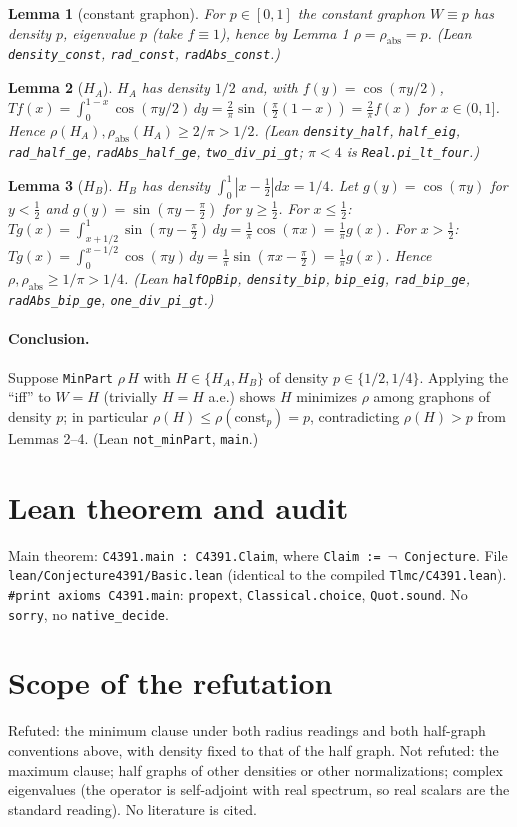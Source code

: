 \documentclass[11pt]{article}
\newtheorem{lemma}{Lemma}
\begin{document}
\begin{lemma}[constant graphon] For $p\in[0,1]$ the constant graphon $W\equiv p$ has density $p$, eigenvalue $p$ (take $f\equiv1$), hence by Lemma 1 $\rho=\rho_{\mathrm{abs}}=p$. (Lean \texttt{density\_const}, \texttt{rad\_const}, \texttt{radAbs\_const}.)\end{lemma}

\begin{lemma}[$H_A$] $H_A$ has density $1/2$ and, with $f(y)=\cos(\pi y/2)$, $T f(x)=\int_0^{1-x}\cos(\pi y/2)\,dy=\frac2\pi\sin(\frac\pi2(1-x))=\frac2\pi f(x)$ for $x\in(0,1]$. Hence $\rho(H_A),\rho_{\mathrm{abs}}(H_A)\ge 2/\pi>1/2$. (Lean \texttt{density\_half}, \texttt{half\_eig}, \texttt{rad\_half\_ge}, \texttt{radAbs\_half\_ge}, \texttt{two\_div\_pi\_gt}; $\pi<4$ is \texttt{Real.pi\_lt\_four}.)\end{lemma}

\begin{lemma}[$H_B$] $H_B$ has density $\int_0^1|x-\frac12|dx=1/4$. Let $g(y)=\cos(\pi y)$ for $y<\frac12$ and $g(y)=\sin(\pi y-\frac\pi2)$ for $y\ge\frac12$. For $x\le\frac12$: $T g(x)=\int_{x+1/2}^1\sin(\pi y-\frac\pi2)\,dy=\frac1\pi\cos(\pi x)=\frac1\pi g(x)$. For $x>\frac12$: $Tg(x)=\int_0^{x-1/2}\cos(\pi y)\,dy=\frac1\pi\sin(\pi x-\frac\pi2)=\frac1\pi g(x)$. Hence $\rho,\rho_{\mathrm{abs}}\ge1/\pi>1/4$. (Lean \texttt{halfOpBip}, \texttt{density\_bip}, \texttt{bip\_eig}, \texttt{rad\_bip\_ge}, \texttt{radAbs\_bip\_ge}, \texttt{one\_div\_pi\_gt}.)\end{lemma}

\paragraph{Conclusion.} Suppose \texttt{MinPart} $\rho\,H$ with $H\in\{H_A,H_B\}$ of density $p\in\{1/2,1/4\}$. Applying the ``iff'' to $W=H$ (trivially $H=H$ a.e.) shows $H$ minimizes $\rho$ among graphons of density $p$; in particular $\rho(H)\le\rho(\text{const}_p)=p$, contradicting $\rho(H)>p$ from Lemmas 2--4. (Lean \texttt{not\_minPart}, \texttt{main}.)

\section*{Lean theorem and audit}
Main theorem: \texttt{C4391.main : C4391.Claim}, where \texttt{Claim := $\neg$ Conjecture}. File \texttt{lean/Conjecture4391/Basic.lean} (identical to the compiled \texttt{Tlmc/C4391.lean}). \texttt{\#print axioms C4391.main}: \texttt{propext}, \texttt{Classical.choice}, \texttt{Quot.sound}. No \texttt{sorry}, no \texttt{native\_decide}.

\section*{Scope of the refutation}
Refuted: the minimum clause under both radius readings and both half-graph conventions above, with density fixed to that of the half graph. Not refuted: the maximum clause; half graphs of other densities or other normalizations; complex eigenvalues (the operator is self-adjoint with real spectrum, so real scalars are the standard reading). No literature is cited.
\end{document}
